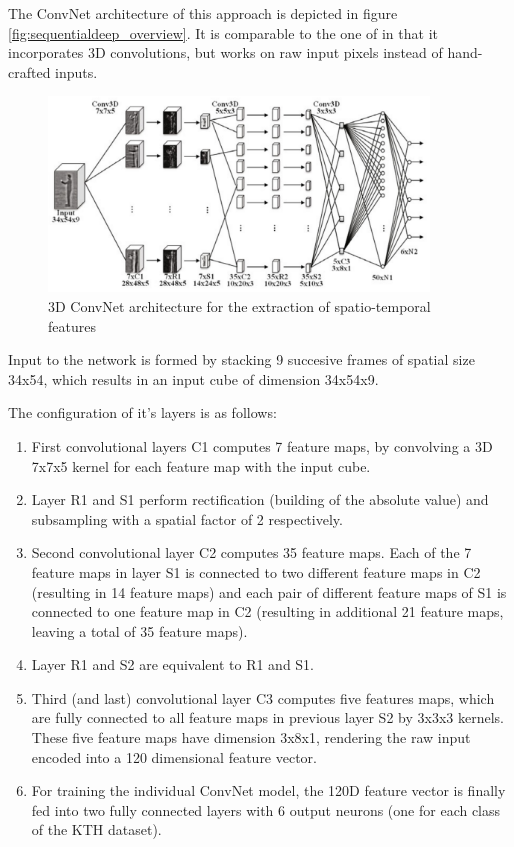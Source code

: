 The ConvNet architecture of this approach is depicted in figure \ref{fig:sequentialdeep_overview}.
It is comparable to the one of \textcite{ji_3d_2013} in that it incorporates 3D convolutions, but works on raw input pixels instead of hand-crafted inputs.

\begin{figure}[H]
    \centering
    \includegraphics[width=0.9\textwidth]{img_deep/sequentialdeep_cnnarchitecture}
    \caption{3D ConvNet architecture for the extraction of spatio-temporal features \cite{baccouche_sequential_2011}}
    \label{fig:sequentialdeep_cnnarchitecture}
\end{figure}

Input to the network is formed by stacking 9 succesive frames of spatial size 34x54, which results in an input cube of dimension 34x54x9.

The configuration of it's layers is as follows:

\begin{enumerate}
    \item First convolutional layers C1 computes 7 feature maps, by convolving a 3D 7x7x5 kernel for each feature map with the input cube.
    \item Layer R1 and S1 perform rectification (building of the absolute value) and subsampling with a spatial factor of 2 respectively.
    \item Second convolutional layer C2 computes 35 feature maps. Each of the 7 feature maps in layer S1 is connected to two different feature maps in C2 (resulting in 14 feature maps) and each pair of different feature maps of S1 is connected to one feature map in C2 (resulting in additional 21 feature maps, leaving a total of 35 feature maps).
    \item Layer R1 and S2 are equivalent to R1 and S1.
    \item Third (and last) convolutional layer C3 computes five features maps, which are fully connected to all feature maps in previous layer S2 by 3x3x3 kernels. These five feature maps have dimension 3x8x1, rendering the raw input encoded into a 120 dimensional feature vector.
    \item For training the individual ConvNet model, the 120D feature vector is finally fed into two fully connected layers with 6 output neurons (one for each class of the KTH dataset).
\end{enumerate}

